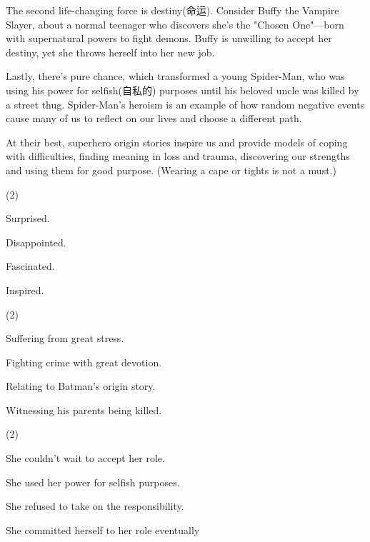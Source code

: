 \documentclass{英语试卷}
\begin{document}
\par The second life-changing force is destiny(命运). Consider Buffy the Vampire Slayer, about a normal teenager who discovers she's the "Chosen One"—born with supernatural powers to fight demons. Buffy is unwilling to accept her destiny, yet she throws herself into her new job.\par
\par Lastly, there's pure chance, which transformed a young Spider-Man, who was using his power for selfish(自私的) purposes until his beloved uncle was killed by a street thug. Spider-Man's heroism is an example of how random negative events cause many of us to reflect on our lives and choose a different path.\par
\par At their best, superhero origin stories inspire us and provide models of coping with difficulties, finding meaning in loss and trauma, discovering our strengths and using them for good purpose. (Wearing a cape or tights is not a must.)\par
{}
\begin{choices}(2)
  \item Surprised.
  \item Disappointed.
  \item Fascinated.
  \item Inspired.
\end{choices}
\begin{choices}(2)
  \item Suffering from great stress.
  \item Fighting crime with great devotion.
  \item Relating to Batman's origin story.
  \item Witnessing his parents being killed.
\end{choices}
\begin{choices}(2)
  \item She couldn't wait to accept her role.
  \item She used her power for selfish purposes.
  \item She refused to take on the responsibility.
  \item She committed herself to her role eventually
\end{choices}
\end{document}

